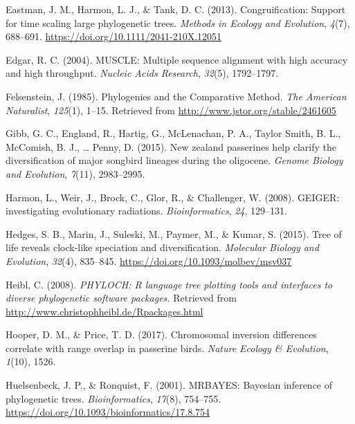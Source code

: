 \documentclass[
  english,
  man]{apa6}
\newlength{\cslhangindent}
\newlength{\cslentryspacingunit} %
\newenvironment{CSLReferences}[2] %
 {%
  \setlength{\parindent}{0pt}
  \ifodd #1
  \let\oldpar\par
  \def\par{\hangindent=\cslhangindent\oldpar}
  \fi
  \setlength{\parskip}{#2\cslentryspacingunit}
 }%
 {}
\begin{document}
\begin{CSLReferences}{1}{0}
\leavevmode{}%
Eastman, J. M., Harmon, L. J., \& Tank, D. C. (2013). {Congruification: Support for time scaling large phylogenetic trees}. \emph{{Methods in Ecology and Evolution}}, \emph{4}(7), 688--691. \url{https://doi.org/10.1111/2041-210X.12051}

\leavevmode{}%
Edgar, R. C. (2004). MUSCLE: Multiple sequence alignment with high accuracy and high throughput. \emph{Nucleic Acids Research}, \emph{32}(5), 1792--1797.

\leavevmode{}%
Felsenstein, J. (1985). {Phylogenies and the Comparative Method}. \emph{The American Naturalist}, \emph{125}(1), 1--15. Retrieved from \url{http://www.jstor.org/stable/2461605}

\leavevmode{}%
Gibb, G. C., England, R., Hartig, G., McLenachan, P. A., Taylor Smith, B. L., McComish, B. J., \ldots{} Penny, D. (2015). New zealand passerines help clarify the diversification of major songbird lineages during the oligocene. \emph{{Genome Biology and Evolution}}, \emph{7}(11), 2983--2995.

\leavevmode{}%
Harmon, L., Weir, J., Brock, C., Glor, R., \& Challenger, W. (2008). {GEIGER: investigating evolutionary radiations}. \emph{Bioinformatics}, \emph{24}, 129--131.

\leavevmode{}%
Hedges, S. B., Marin, J., Suleski, M., Paymer, M., \& Kumar, S. (2015). {Tree of life reveals clock-like speciation and diversification}. \emph{{Molecular Biology and Evolution}}, \emph{32}(4), 835--845. \url{https://doi.org/10.1093/molbev/msv037}

\leavevmode{}%
Heibl, C. (2008). \emph{PHYLOCH: R language tree plotting tools and interfaces to diverse phylogenetic software packages.} Retrieved from \url{http://www.christophheibl.de/Rpackages.html}

\leavevmode{}%
Hooper, D. M., \& Price, T. D. (2017). Chromosomal inversion differences correlate with range overlap in passerine birds. \emph{Nature Ecology \& Evolution}, \emph{1}(10), 1526.

\leavevmode{}%
Huelsenbeck, J. P., \& Ronquist, F. (2001). {MRBAYES: Bayesian inference of phylogenetic trees}. \emph{Bioinformatics}, \emph{17}(8), 754--755. \url{https://doi.org/10.1093/bioinformatics/17.8.754}


\end{CSLReferences}
\end{document}
